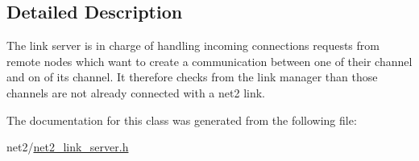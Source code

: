 \subsection{Detailed Description}
The link server is in charge of handling incoming connections requests from remote nodes which want to create a communication between one of their channel and on of its channel. It therefore checks from the link manager than those channels are not already connected with a net2 link. 

The documentation for this class was generated from the following file\-:\begin{DoxyCompactItemize}
\item 
net2/\hyperlink{net2__link__server_8h}{net2\-\_\-link\-\_\-server.\-h}\end{DoxyCompactItemize}
